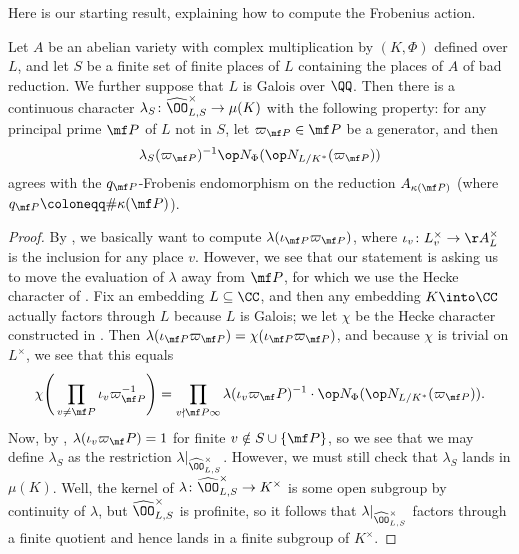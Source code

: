 \documentclass[../thesis.tex]{subfiles}
\begin{document}
Here is our starting result, explaining how to compute the Frobenius action.
\begin{proposition} \label{prop:fundamental-compute-frob}
	Let $A$ be an abelian variety with complex multiplication by $(K,\Phi)$ defined over $L$, and let $S$ be a finite set of finite places of $L$ containing the places of $A$ of bad reduction. We further suppose that $L$ is Galois over $\QQ$. Then there is a continuous character $\lambda_S\colon\widehat\OO_{L,S}^\times\to\mu(K)$ with the following property: for any principal prime $\mf P$ of $L$ not in $S$, let $\varpi_{\mf P}\in\mf P$ be a generator, and then
	\[\lambda_S(\varpi_{\mf P})^{-1}\op N_\Phi(\op N_{L/K^*}(\varpi_{\mf P}))\]
	agrees with the $q_{\mf P}$-Frobenis endomorphism on the reduction $A_{\kappa(\mf P)}$ (where $q_{\mf P}\coloneqq\#\kappa(\mf P)$).
\end{proposition}
\begin{proof}
	By , we basically want to compute $\lambda(\iota_{\mf P}\varpi_{\mf P})$, where $\iota_v\colon L_v^\times\to\AA_L^\times$ is the inclusion for any place $v$. However, we see that our statement is asking us to move the evaluation of $\lambda$ away from $\mf P$, for which we use the Hecke character of . Fix an embedding $L\subseteq\CC$, and then any embedding $K\into\CC$ actually factors through $L$ because $L$ is Galois; we let $\chi$ be the Hecke character constructed in . Then $\lambda(\iota_{\mf P}\varpi_{\mf P})=\chi(\iota_{\mf P}\varpi_{\mf P})$, and because $\chi$ is trivial on $L^\times$, we see that this equals
	\[\chi\Bigg(\prod_{v\ne\mf P}\iota_v\varpi_{\mf P}^{-1}\Bigg)=\prod_{v\nmid\mf P\infty}\lambda(\iota_v\varpi_\mf P)^{-1}\cdot\op N_\Phi(\op N_{L/K^*}(\varpi_{\mf P})).\]
	Now, by , $\lambda(\iota_v\varpi_\mf P)=1$ for finite $v\notin S\cup\{\mf P\}$, so we see that we may define $\lambda_S$ as the restriction $\lambda|_{\widehat\OO_{L,S}^\times}$. However, we must still check that $\lambda_S$ lands in $\mu(K)$. Well, the kernel of $\lambda\colon\widehat\OO_{L,S}^\times\to K^\times$ is some open subgroup by continuity of $\lambda$, but $\widehat\OO_{L,S}^\times$ is profinite, so it follows that $\lambda|_{\widehat\OO_{L,S}^\times}$ factors through a finite quotient and hence lands in a finite subgroup of $K^\times$.
\end{proof}
\end{document}
